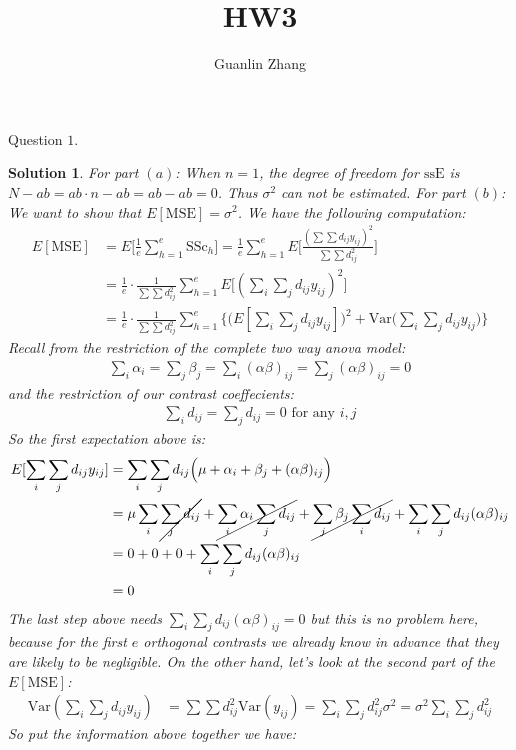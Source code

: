 \documentclass[11pt]{article}
\title{HW3}
\author{Guanlin Zhang}
\newtheorem{sol}{Solution}
\begin{document}
Question $1$.
\begin{sol}
	For part $(a)$:\vskip 2mm
	When $n = 1$, the degree of freedom for $\text{ssE}$ is $N - ab = ab\cdot n - ab = ab - ab = 0$. Thus $\sigma^2$ can not be estimated.\vskip 2mm
	For part $(b)$:\vskip 2mm
	We want to show that $E[\text{MSE}] = \sigma^2$. We have the following computation:
	\begin{align*}
		E[\text{MSE}] &= E\Big[\frac{1}{e}\sum_{h = 1}^e\text{SSc}_h\Big] = \frac{1}{e}\sum_{h = 1}^{e}E\Big[\frac{(\sum\sum d_{ij}y_{ij})^2}{\sum\sum d_{ij}^2}\Big]\\
		&= \frac{1}{e}\cdot \frac{1}{\sum\sum d_{ij}^2} \sum_{h = 1}^e E\Big[(\sum_i\sum_j d_{ij}y_{ij})^2\Big]\\
		&=  \frac{1}{e}\cdot \frac{1}{\sum\sum d_{ij}^2} \sum_{h = 1}^e\Big\{\Big( E[\sum_i\sum_j d_{ij}y_{ij}]\Big)^2 + \text{Var}\Big(\sum_i\sum_j d_{ij}y_{ij}\Big)\Big\}
	\end{align*}
Recall from the restriction of the complete two way anova model: 
\begin{align*}
	\sum_i \alpha_i = \sum_j\beta_j = \sum_i(\alpha\beta)_{ij} = \sum_j(\alpha\beta)_{ij} = 0
\end{align*}
and the restriction of our contrast coeffecients:
\begin{align*}
	\sum_id_{ij} = \sum_j d_{ij} = 0 \text{ for any }i, j
\end{align*}
So the first expectation above is:
\begin{align*}
	E[\sum_i\sum_j d_{ij}y_{ij}] &= \sum_i\sum_j d_{ij}\Big(\mu + \alpha_i + \beta_j + (\alpha\beta)_{ij}\Big)\\
	&= \mu\sum_i\cancel{\sum_j d_{ij}} + \cancel{\sum_i\alpha_i\sum_j d_{ij}}  + \cancel{\sum_j\beta_j\sum_i d_{ij}} + \sum_i\sum_j d_{ij}(\alpha\beta)_{ij}\\
	&= 0 + 0 + 0 + \sum_i\sum_jd_{ij}(\alpha\beta)_{ij}\\
	&= 0
\end{align*}
The last step above needs $\sum_i\sum_j d_{ij}(\alpha\beta)_{ij} = 0$ but this is no problem here,  because for the first $e$ orthogonal contrasts we already know in advance that they are likely to be negligible.\vskip 2mm
On the other hand, let's look at the second part of the $E[\text{MSE}]$:
\begin{align*}
	\text{Var}(\sum_i\sum_j d_{ij}y_{ij}) &= \sum\sum d_{ij}^2\text{Var}(y_{ij}) = \sum_i\sum_j d^2_{ij}\sigma^2 = \sigma^2\sum_i\sum_jd^2_{ij}
\end{align*}
So put the information above together we have:

\end{sol}
\end{document}
